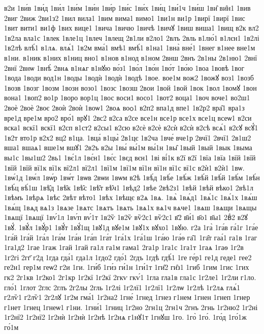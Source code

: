 {в2и
1ви́в
1ви́д
1ви́л
1ви́м
1ви́н
1ви́р
1ви́с
1ви́х
1ви́ц
1ви́1ч
1ви́ш
1ви̑
ви̑н1
1вив
2виг
2виж
2ви1з2
1вил
вила1
1вим
вима1
вимо1
1ви1н
ви1р
1вирї
1вирї
1вис
1вит
вити1
ви1ф
1вих
вице1
1вича
1вичю
1вичѣ
1вичꙋ
1виш
виша1
1вищ
в2к
вл2
1в2ла
вла1с
1влек
1вле1ц
1влеч
1влещ
2в1ли
в2ло1
2влъ
2вль
в1лю́1
в1лєн1
1в2лі
1в2лѣ
влѣ́1
в1лѧ.
влѧ́1
1в2м
вма́1
вмѣ1
вмѣ́1
в1на1
1вна̀
вне́1
1внег
в1нее
вне1м
в1ни.
в1ник
в1них
в1ниц
вно1
в1нов
в1нод
в1ном
2внш
2внъ
2в1ны
2в1ню1
2внї
2внї
2внѡ
1внѣ̀
2внѧ
в1нѧг
в1нꙋю
во́з1
1во́л
1во́н
1во́т
1во́ю
1воа
1вовѣ
1вог
1вода
1води
вод1н
1воды
1водѝ
1водѝ
1водѣ
1вое.
вое1м
вож2
1вожꙋ
воз1
1возб
1возв
1возг
1возм
1возн
возо1
1возс
1возш
2вои
1вой
1вой
1вок
1вол
1вомꙋ
1вон
вона1
1воп2
во1р
1воро
вор1ц
1вос
воси1
восо1
1вот2
воца1
1воч
воче1
во2ш1
2воѐ
2воѐ
2воє
2воѝ
2воѝ
1воѡ1
2воѧ
воѻ1
в2п2
впа1д
впе1
1в2р2
вра̑1
вра1з
вре1д
вре1м
вро2
вро́1
врꙋ1
2вс2
в2са
в2се
все1н
все1р
все1х
все1ц
всеѡ1
в2си
вска1
вскї1
вскї1
в2сп
в1ст2
в2сы1
в2сю
в2сѐ
в2сѐ
в2сѝ
в2сѝ
в2сѣ
всѧ́1
в2сꙋ
всꙋ́1
1в2т
вто1р
в2х2
вц2
в1ца.
1вца́
в1цы̀
2в1цє
1в2ча
1вче́
вче1р
2вчї1
2вчї1
2в1ш2
вша1
вшаѧ1
вше1м
вшꙋ1
2в2ъ
в2ы
1вы́
вы́1м
вы́1н
1вы̑
1вый
1вый
1вык
1выма
вы1с
1вы1ш2
2вь1
1вє́1л
1вє́н1
1вє́с
1вєд
вєн1
1ві
ві́1к
в2ї
в2ї
1вїа
1вїа
1вїй
1вїй
1вїй
1вїй
вї1к
вї1к
вї2л1
вї2л1
1вї1м
1вї1м
вї1н
вї1н
вї1с
вї1с
в2ѝ1
в2ѝ1
1вѡ.
1вѡ́1д
1вѡ́л
1вѡ́р
1вѡ́т
1вѡв
2вѡи
1вѡм
в2ѣ
1вѣ́д
1вѣ́е
1вѣ́ж
1вѣ́й
1вѣ́й
1вѣ́м
1вѣ́н
1вѣ́ц
вѣ́1ш
1вѣ̑д
1вѣ̑к
1вѣ̑с
1вѣ̑т
вѣ̑ч1
1вѣд2
1вѣе
2вѣ2з1
1вѣй
1вѣй
вѣко1
2вѣ1л
1вѣмъ
1вѣрѧ
1вѣс
2вѣт
вѣто1
1вѣх
1вѣщє
в2ѧ
1вѧ.
1вѧ̀
1вѧ́д1
1вѧ́1с
1вѧ́1х
1вѧ́ш
1вѧ́щ
1вѧд
вѧ1з
1вѧзе
1вѧтс
1вѧтъ
1вѧть
1вѧ1х
вѧ1ч
вѧче1
1вѧш
1вѧщи
1вѧщы
1вѧщї
1вѧщї
1вѵ́1л
1вѵ́п
вѵ́1т
1в2ѷ
1в2ѷ
вѷ2с1
вѷ2с1
в҃2
в҃и́1
в҃о1
в҃ы1
2вⷣ2
в2ꙋ
1вꙋ́.
1вꙋ́л
1вꙋ́р1
1вꙋ́т
1вꙋ́1щ
1вꙋ1д
вꙋе1м
1вꙋ1х
вꙋхо1
1вꙋю.
г2а
1га̀
1га́в
га́1г
1га́е
1га́й
1га́й
1га́л
1га́м
1га́н
1га́п
1га́т
1га́1х
1га́1ш
1га́ю
1га́ѳ
га̑1
1га̑т
гаа́1
га1в
1гаг
1га1д2
1гае
1гаж
1гай
1гай
га1л
га1м
гама1
2га1р
1га1с
1га1т
1гаѧ
1гаѳ
1г2в
1г2гі
2гг҃
г2д
1гда
гда́1
гда1л
1гдо2
гдо́1
2гдъ
1гдѣ
гдѣ́1
1ге
ге́р1
ге1д
геде1
гее2
ге2н1
гер1м
геѡ2
г2и
1ги.
1ги́б
1ги́з
ги́1н
1ги́1т
1ги̑2
ги̑з1
1гиб
1гим
1гис
1гих
гк2
2г1кв
1г2ко1
2г1кр
1г2кї
1г2кї
2гкѵ
гкѵ́1
1гла
гла1в
гла1с
1г2ле1
1г2ли
г1ло.
гло́1
1глот
2глс
2глъ
2г2лы
2гль
1г2лі
1г2лї1
1г2лї1
1г2лѡ
1г2лѣ
1г2лѧ
глѧ́1
г2лѷ1
г2лѷ1
2г2лꙋ
1г2м
гма́1
1г2на2
1гне́
1гнед
1гнез
г1нем
1гнен
1гнеп
1гнер
г1нет
1гнец
1гнеѡ1
г1ни.
1гни́1
1гниц
1г2но
2гн1ц
2гн1ч
2гнъ
2гнь
1г2ню2
1г2ні
1г2нї2
1г2нї2
1г2нѝ
1г2нѝ
1г2нѣ
1г2нѧ
г1нꙋ1т
1гнꙋш
1го.
1го̀
1го́.
1го́д
1го́1ж
го́1м
}

